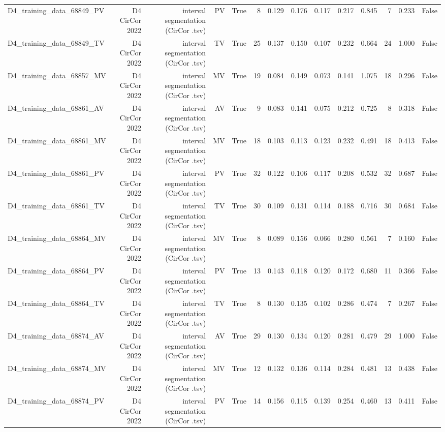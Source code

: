 \begin{table}[htbp]
\begin{tabular}{lrrrrrrrrrrrrr}
    D4\_training\_data\_68849\_PV & D4 CirCor 2022 & interval segmentation (CirCor .tsv) & PV & True & 8 & 0.129 & 0.176 & 0.117 & 0.217 & 0.845 & 7 & 0.233 & False \\
    D4\_training\_data\_68849\_TV & D4 CirCor 2022 & interval segmentation (CirCor .tsv) & TV & True & 25 & 0.137 & 0.150 & 0.107 & 0.232 & 0.664 & 24 & 1.000 & False \\
    D4\_training\_data\_68857\_MV & D4 CirCor 2022 & interval segmentation (CirCor .tsv) & MV & True & 19 & 0.084 & 0.149 & 0.073 & 0.141 & 1.075 & 18 & 0.296 & False \\
    D4\_training\_data\_68861\_AV & D4 CirCor 2022 & interval segmentation (CirCor .tsv) & AV & True & 9 & 0.083 & 0.141 & 0.075 & 0.212 & 0.725 & 8 & 0.318 & False \\
    D4\_training\_data\_68861\_MV & D4 CirCor 2022 & interval segmentation (CirCor .tsv) & MV & True & 18 & 0.103 & 0.113 & 0.123 & 0.232 & 0.491 & 18 & 0.413 & False \\
    D4\_training\_data\_68861\_PV & D4 CirCor 2022 & interval segmentation (CirCor .tsv) & PV & True & 32 & 0.122 & 0.106 & 0.117 & 0.208 & 0.532 & 32 & 0.687 & False \\
    D4\_training\_data\_68861\_TV & D4 CirCor 2022 & interval segmentation (CirCor .tsv) & TV & True & 30 & 0.109 & 0.131 & 0.114 & 0.188 & 0.716 & 30 & 0.684 & False \\
    D4\_training\_data\_68864\_MV & D4 CirCor 2022 & interval segmentation (CirCor .tsv) & MV & True & 8 & 0.089 & 0.156 & 0.066 & 0.280 & 0.561 & 7 & 0.160 & False \\
    D4\_training\_data\_68864\_PV & D4 CirCor 2022 & interval segmentation (CirCor .tsv) & PV & True & 13 & 0.143 & 0.118 & 0.120 & 0.172 & 0.680 & 11 & 0.366 & False \\
    D4\_training\_data\_68864\_TV & D4 CirCor 2022 & interval segmentation (CirCor .tsv) & TV & True & 8 & 0.130 & 0.135 & 0.102 & 0.286 & 0.474 & 7 & 0.267 & False \\
    D4\_training\_data\_68874\_AV & D4 CirCor 2022 & interval segmentation (CirCor .tsv) & AV & True & 29 & 0.130 & 0.134 & 0.120 & 0.281 & 0.479 & 29 & 1.000 & False \\
    D4\_training\_data\_68874\_MV & D4 CirCor 2022 & interval segmentation (CirCor .tsv) & MV & True & 12 & 0.132 & 0.136 & 0.114 & 0.284 & 0.481 & 13 & 0.438 & False \\
    D4\_training\_data\_68874\_PV & D4 CirCor 2022 & interval segmentation (CirCor .tsv) & PV & True & 14 & 0.156 & 0.115 & 0.139 & 0.254 & 0.460 & 13 & 0.411 & False \\

\end{tabular}
\end{table}
